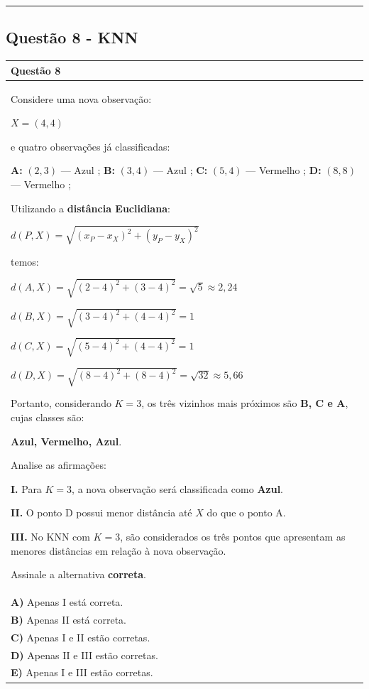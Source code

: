 \documentclass[
]{book}
\begin{document}
\begin{center}\rule{0.5\linewidth}{0.5pt}\end{center}

\subsection{Questão 8 - KNN}\label{questuxe3o-8---knn}

\begin{longtable}[]{@{}
  >{\raggedright\arraybackslash}p{}@{}}
\toprule\noalign{}
\begin{minipage}[b]{\linewidth}\raggedright
\textbf{Questão 8}
\end{minipage} \\
\midrule\noalign{}
\endhead
\bottomrule\noalign{}
\endlastfoot
Considere uma nova observação:

\(\displaystyle X=(4,4)\)

e quatro observações já classificadas:

\textbf{A:} \((2,3)\) --- Azul ; \textbf{B:} \((3,4)\) --- Azul ; \textbf{C:} \((5,4)\) --- Vermelho ; \textbf{D:} \((8,8)\) --- Vermelho ;

Utilizando a \textbf{distância Euclidiana}:

\(\displaystyle d(P,X)=\sqrt{(x_P-x_X)^2+(y_P-y_X)^2}\)

temos:

\(\displaystyle d(A,X)=\sqrt{(2-4)^2+(3-4)^2}=\sqrt{5}\approx 2{,}24\)

\(\displaystyle d(B,X)=\sqrt{(3-4)^2+(4-4)^2}=1\)

\(\displaystyle d(C,X)=\sqrt{(5-4)^2+(4-4)^2}=1\)

\(\displaystyle d(D,X)=\sqrt{(8-4)^2+(8-4)^2}=\sqrt{32}\approx 5{,}66\)

Portanto, considerando \(K=3\), os três vizinhos mais próximos são \textbf{B, C e A}, cujas classes são:

\textbf{Azul, Vermelho, Azul}.

Analise as afirmações:

\textbf{I.} Para \(K=3\), a nova observação será classificada como \textbf{Azul}.

\textbf{II.} O ponto D possui menor distância até \(X\) do que o ponto A.

\textbf{III.} No KNN com \(K=3\), são considerados os três pontos que apresentam as menores distâncias em relação à nova observação.

Assinale a alternativa \textbf{correta}. \\
\textbf{A)} Apenas I está correta. \\
\textbf{B)} Apenas II está correta. \\
\textbf{C)} Apenas I e II estão corretas. \\
\textbf{D)} Apenas II e III estão corretas. \\
\textbf{E)} Apenas I e III estão corretas. \\
\end{longtable}
\end{document}
